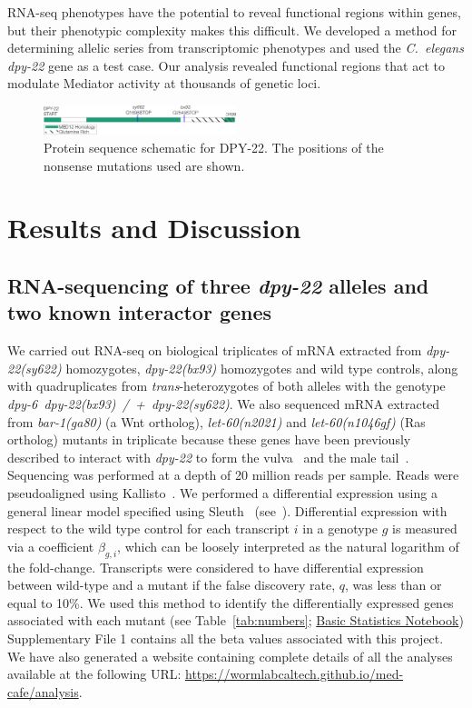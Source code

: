 \documentclass[8pt, twocolumn]{article}
\newcommand{\cel}{\emph{C.~elegans}}
\newcommand{\gene}[1]{\mbox{\emph{#1}}}
\newcommand{\protein}[1]{\mbox{\uppercase{#1}}}
\newcommand{\dpy}[1]{\gene{dpy-22#1}}
\newcommand{\bx}{\dpy{(bx93)}}
\newcommand{\sy}{\dpy{(sy622)}}
\begin{document}
RNA-seq phenotypes have the potential to reveal functional regions within genes,
but their phenotypic complexity makes this difficult. We developed a method for
determining allelic series from transcriptomic phenotypes and used the \cel{}
\dpy{} gene as a test case. Our analysis revealed functional regions that act to
modulate Mediator activity at thousands of genetic loci.

\begin{figure}
  \centering{}
  \includegraphics[width=0.5\textwidth]{../figs/Gene_Model.pdf}
  \caption{
           Protein sequence schematic for \protein{dpy-22}. The positions of the
           nonsense mutations used are shown.
           }
\label{fig:genemodel}
\end{figure}


\section*{Results and Discussion}
\subsection*{RNA-sequencing of three \gene{dpy-22} alleles and two known
             interactor genes}
We carried out RNA-seq on biological triplicates of mRNA extracted from \sy{}
homozygotes, \bx{} homozygotes and wild type controls, along with quadruplicates
from \emph{trans}-heterozygotes of both alleles with the genotype
\gene{dpy-6 dpy-22(bx93) / + dpy-22(sy622)}. We also sequenced mRNA
extracted from \gene{bar-1(ga80)} (a Wnt ortholog), \gene{let-60(n2021)} and
\gene{let-60(n1046gf)} (Ras ortholog) mutants in triplicate because these genes
have been previously described to interact with \dpy{} to form the
vulva~\cite{Moghal2003} and the male tail~\cite{Zhang2000}. Sequencing was
performed at a depth of 20 million reads per sample. Reads were pseudoaligned
using Kallisto~\cite{Bray2016}. We performed a differential expression using a
general linear model specified using Sleuth~\cite{Pimentel2016a}
(see~). Differential expression with respect to the wild
type control for each transcript $i$ in a genotype $g$ is measured via a
coefficient $\beta_{g, i}$, which can be loosely interpreted as the natural
logarithm of the fold-change. Transcripts were considered to have differential
expression between wild-type and a mutant if the false discovery rate, $q$, was
less than or equal to 10\%. We used this method to identify the differentially
expressed genes associated with each mutant (see Table~\ref{tab:numbers};
\href{https://wormlabcaltech.github.io/med-cafe/notebook/basic.html}{Basic
Statistics Notebook})
Supplementary File 1 contains all the beta values associated with this project.
We have also generated a website containing complete details of all the analyses
available at the following URL:\@
\url{https://wormlabcaltech.github.io/med-cafe/analysis}.
\end{document}
